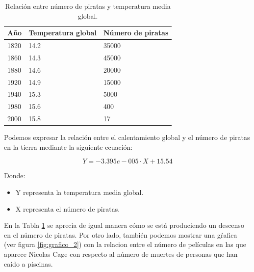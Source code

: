 \documentclass{article}
\begin{document}
\begin{table}[h]
\centering
\begin{tabular}{|l|l|l|}
\hline
\multicolumn{1}{|c|}{\textbf{Año}} & \multicolumn{1}{c|}{\textbf{Temperatura global}} & \multicolumn{1}{c|}{\textbf{Número de piratas}} \\ \hline
1820                               & 14.2                                             & 35000                                           \\ \hline
1860                               & 14.3                                             & 45000                                           \\ \hline
1880                               & 14.6                                             & 20000                                           \\ \hline
1920                               & 14.9                                             & 15000                                           \\ \hline
1940                               & 15.3                                             & 5000                                            \\ \hline
1980                               & 15.6                                             & 400                                             \\ \hline
2000                               & 15.8                                             & 17                                              \\ \hline
\end{tabular}
\caption{Relación entre número de piratas y temperatura media global.}
\label{table:tabla_1}
\end{table}

Podemos expresar la relación entre el calentamiento global y el número de piratas en la tierra mediante la siguiente ecuación:

\begin{equation}
    Y = -3.395e-005\cdot X + 15.54 
\end{equation}


Donde:
\begin{itemize}
    \item Y representa la temperatura media global.
    \item X representa el número de piratas.
\end{itemize}

En la Tabla \ref{table:tabla_1} se aprecia de igual manera cómo se está produciendo un descenso en el número de piratas. Por otro lado, también podemos mostrar una gŕafica (ver figura \ref{fig:grafico_2}) con la relacion entre el número de películas en las que aparece Nicolas Cage con respecto al número de muertes de personas que han caído a piscinas.
\end{document}
